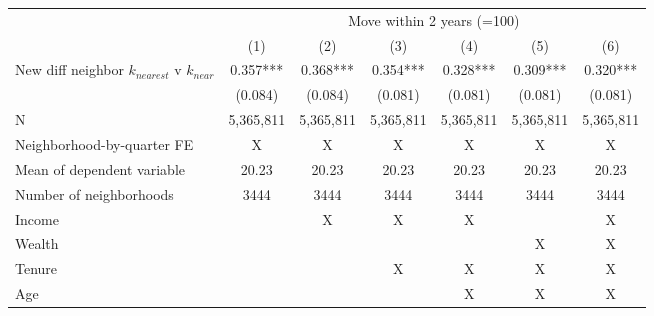 \begin{tabular}{lcccccc}
\toprule
 & \multicolumn{6}{c}{Move within 2 years (=100)} \\ 
\cmidrule(lr){2-7}
  & (1) & (2) & (3) & (4) & (5) & (6) \\ 
\midrule
New diff neighbor $k_{nearest}$ v $k_{near}$ & 0.357*** & 0.368*** & 0.354*** & 0.328*** & 0.309*** & 0.320*** \\ 
 & (0.084) & (0.084) & (0.081) & (0.081) & (0.081) & (0.081) \\  
 \midrule
N & 5,365,811 & 5,365,811 & 5,365,811 & 5,365,811 & 5,365,811 & 5,365,811 \\ 
Neighborhood-by-quarter FE & X & X & X & X & X & X \\ 
Mean of dependent variable & 20.23 & 20.23 & 20.23 & 20.23 & 20.23 & 20.23 \\ 
Number of neighborhoods & 3444 & 3444 & 3444 & 3444 & 3444 & 3444 \\ 
Income &  & X & X & X &  & X \\ 
Wealth &  &  &  &  & X & X \\ 
Tenure &  &  & X & X & X & X \\ 
Age &  &  &  & X & X & X \\ 
\bottomrule
\end{tabular}